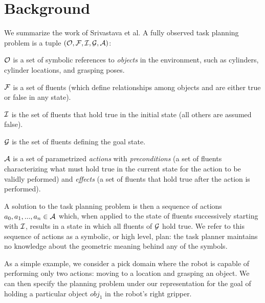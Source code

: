 \section{Background}
We summarize the work of Srivastava et al. A fully observed task planning
problem is a tuple $(\mathcal{O}, \mathcal{F}, \mathcal{I}, \mathcal{G}, \mathcal{A})$:

$\mathcal{O}$ is a set of symbolic references to \emph{objects} in the environment,
such as cylinders, cylinder locations, and grasping poses.

$\mathcal{F}$ is a set of fluents (which define relationships among objects and are either
true or false in any state).

$\mathcal{I}$ is the set of fluents that hold true in the initial state
(all others are assumed false).

$\mathcal{G}$ is the set of fluents defining the goal state.

$\mathcal{A}$ is a set of parametrized \emph{actions} with \emph{preconditions} (a set
of fluents characterizing what must hold true in the current state for the action
to be validly peformed) and \emph{effects} (a set of fluents that hold true after
the action is performed).

A solution to the task planning problem is then a sequence of actions
$a_{0}, a_{1}, ..., a_{n} \in \mathcal{A}$ which, when applied to the state of fluents
successively starting with $\mathcal{I}$, results in a state in which all fluents of
$\mathcal{G}$ hold true. We refer to this sequence of actions as a symbolic, or
high level, plan: the task planner maintains no knowledge about the geometric meaning
behind any of the symbols.

As a simple example, we consider a pick domain where the robot is capable of
performing only two actions: moving to a location and grasping an object. We can
then specify the planning problem under our representation for the goal of holding
a particular object $obj_{1}$ in the robot's right gripper.

